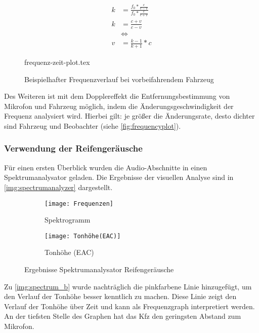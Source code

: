 \begin{equation*}
    \begin{split}
        k & = \frac{f_{0} * \frac{c}{c - v}}{f_{0} * \frac{c}{c + v}} \\
        k & = \frac{c + v}{c - v} \\
        & \Leftrightarrow \\
        v & = \frac{k - 1}{k + 1} * c
    \end{split}
\end{equation*}

\begin{figure}[h]
    \centering
    {frequenz-zeit-plot.tex}
    \caption{Beispielhafter Frequenzverlauf bei vorbeifahrendem Fahrzeug}
    \label{fig:frequencyplot}
\end{figure}

Des Weiteren ist mit dem Dopplereffekt die Entfernungsbestimmung von Mikrofon und Fahrzeug möglich, indem die Änderungsgeschwindigkeit der Frequenz analysiert wird. Hierbei gilt: je größer die Änderungsrate, desto dichter sind Fahrzeug und Beobachter (siehe \autoref{fig:frequencyplot}).

\subsubsection{Verwendung der Reifengeräusche}

Für einen ersten Überblick wurden die Audio-Abschnitte in einen Spektrumanalysator geladen. Die Ergebnisse der visuellen Analyse sind in \autoref{img:spectrumanalyzer} dargestellt.

\begin{figure}[h]
    \begin{subfigure}{.5\textwidth}
        \centering
        \texttt{[image: Frequenzen]}
        \caption{Spektrogramm}
    \end{subfigure}
    \begin{subfigure}{.5\textwidth}
        \centering
        \texttt{[image: Tonhöhe(EAC)]}
        \caption{Tonhöhe (EAC)}
        \label{img:spectrum_b}
    \end{subfigure}
    \caption{Ergebnisse Spektrumanalysator Reifengeräusche}
    \label{img:spectrumanalyzer}
\end{figure}

Zu \autoref{img:spectrum_b} wurde nachträglich die pinkfarbene Linie hinzugefügt, um den Verlauf der Tonhöhe besser kenntlich zu machen. Diese Linie zeigt den Verlauf der Tonhöhe über Zeit und kann als Frequenzgraph interpretiert werden. An der tiefsten Stelle des Graphen hat das Kfz den geringsten Abstand zum Mikrofon.


